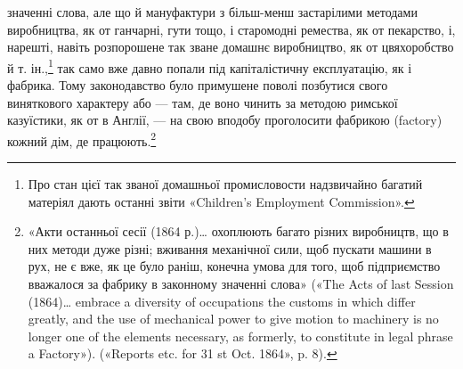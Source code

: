 \parcont{}  %
значенні слова, але що й мануфактури з більш-менш застарілими
методами виробництва, як от ганчарні, гути тощо, і старомодні
ремества, як от пекарство, і, нарешті, навіть розпорошене
так зване домашнє виробництво, як от цвяхоробство й т. ін.,\footnote{
Про стан цієї так званої домашньої промисловости надзвичайно
багатий матеріял дають останні звіти «Children’s Employment Commission».
}
так само вже давно попали під капіталістичну експлуатацію,
як і фабрика. Тому законодавство було примушене поволі
позбутися свого виняткового характеру або — там, де воно чинить
за методою римської казуїстики, як от в Англії, — на свою вподобу
проголосити фабрикою (factory) кожний дім, де працюють.\footnote{
«Акти останньої сесії (1864 р.)\dots{} охоплюють багато різних виробництв,
що в них методи дуже різні; вживання механічної сили, щоб пускати
машини в рух, не є вже, як це було раніш, конечна умова для того, щоб
підприємство вважалося за фабрику в законному значенні слова» («The
Acts of last Session (1864)\dots{} embrace a diversity of occupations the customs
in which differ greatly, and the use of mechanical power to give motion to
machinery is no longer one of the elements necessary, as formerly, to constitute
in legal phrase a Factory»). («Reports etc. for 31 st Oct. 1864», p. 8).
}


